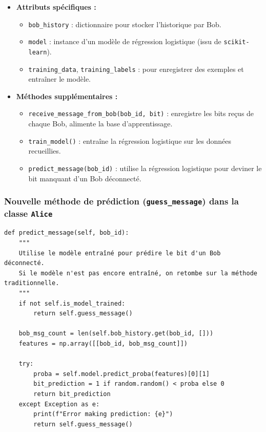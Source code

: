 \documentclass[a4paper,12pt]{article}
\begin{document}
\begin{itemize}
    \item \textbf{Attributs spécifiques :}
    \begin{itemize}
        \item \texttt{bob\_history} : dictionnaire pour stocker l’historique par Bob.
        \item \texttt{model} : instance d’un modèle de régression logistique (issu de \texttt{scikit-learn}).
        \item \texttt{training\_data}, \texttt{training\_labels} : pour enregistrer des exemples et entraîner le modèle.
    \end{itemize}

    \item \textbf{Méthodes supplémentaires :}
    \begin{itemize}
        \item \texttt{receive\_message\_from\_bob(bob\_id, bit)} : enregistre les bits reçus de chaque Bob, alimente la base d’apprentissage.
        \item \texttt{train\_model()} : entraîne la régression logistique sur les données recueillies.
        \item \texttt{predict\_message(bob\_id)} : utilise la régression logistique pour deviner le bit manquant d’un Bob déconnecté.
    \end{itemize}
\end{itemize}

\subsubsection{Nouvelle méthode de prédiction (\texttt{guess\_message}) dans la classe \texttt{Alice}}

\begin{verbatim}
def predict_message(self, bob_id):
    """
    Utilise le modèle entraîné pour prédire le bit d'un Bob déconnecté.
    Si le modèle n'est pas encore entraîné, on retombe sur la méthode traditionnelle.
    """
    if not self.is_model_trained:
        return self.guess_message()

    bob_msg_count = len(self.bob_history.get(bob_id, []))
    features = np.array([[bob_id, bob_msg_count]])

    try:
        proba = self.model.predict_proba(features)[0][1]
        bit_prediction = 1 if random.random() < proba else 0
        return bit_prediction
    except Exception as e:
        print(f"Error making prediction: {e}")
        return self.guess_message()
\end{verbatim}
\end{document}
